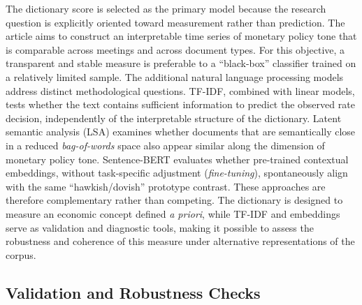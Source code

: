 \documentclass{article}
\begin{document}
The dictionary score is selected as the primary model because the research question is explicitly oriented toward measurement rather than prediction. The article aims to construct an interpretable time series of monetary policy 
tone that is comparable across meetings and across document types. For this objective, a transparent and stable measure is preferable to a ``black-box'' classifier trained on a relatively limited sample.
The additional natural language processing models address distinct methodological questions. TF-IDF, combined with linear models, tests whether the text contains sufficient information to predict the observed rate decision, 
independently of the interpretable structure of the dictionary. Latent semantic analysis (LSA) examines whether documents that are semantically close in a reduced \textit{bag-of-words} space also appear similar along the dimension 
of monetary policy tone. Sentence-BERT evaluates whether pre-trained contextual embeddings, without task-specific adjustment (\textit{fine-tuning}), spontaneously align with the same ``hawkish/dovish'' prototype contrast.
These approaches are therefore complementary rather than competing. The dictionary is designed to measure an economic concept defined \textit{a priori}, while TF-IDF and embeddings serve as validation and diagnostic tools, making 
it possible to assess the robustness and coherence of this measure under alternative representations of the corpus.

\subsection{Validation and Robustness Checks}
\end{document}
